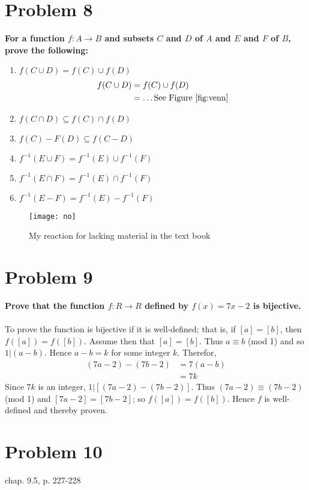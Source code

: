 \documentclass[english,11pt,a4paper]{article}
\begin{document}
\section*{Problem 8}
\textbf{For a function $f: A \rightarrow B$ and subsets $C$ and $D$ of $A$ and $E$ and $F$ of $B$, prove the following:}
\begin{enumerate}[a]
\item $f(C \cup D) = f(C)\cup f(D)$
\begin{align}
f(C \cup D) &= f(C)\cup f(D)\\
	&= \ldots \text{See Figure \ref{fig:venn}}
\end{align}
\item $f(C \cap D) \subseteq f(C)\cap f(D)$
\item $f(C)-F(D) \subseteq f(C-D)$
\item $f^{-1}(E\cup F)=f^{-1}(E) \cup f^{-1}(F)$
\item $f^{-1}(E\cap F)=f^{-1}(E) \cap f^{-1}(F)$
\item $f^{-1}(E - F)=f^{-1}(E) - f^{-1}(F)$
\end{enumerate}
\begin{figure}[hbtp]
\centering
\texttt{[image: no]}
\caption{My reaction for lacking material in the text book}
\label{fig:venn}
\end{figure}


\section*{Problem 9}
\textbf{Prove that the function $f: R \rightarrow R$ defined by $f(x)=7x-2$ is bijective.}
\\
\\
To prove the function is bijective if it is well-defined; that is, if $[a] = [b]$, then $f([a])=f([b])$.
Assume then that $[a]=[b]$.
Thus $a \equiv b$ (mod 1) and so $1|(a-b)$. 
Hence $a-b=k$ for some integer $k$. Therefor,
\begin{align}
(7a-2)-(7b-2) &= 7(a-b)\\
	&= 7k
\end{align}
Since $7k$ is an integer, $1|[(7a-2)-(7b-2)]$. Thus $(7a-2)\equiv (7b-2)$(mod 1) and $[7a-2]=[7b-2]$; so $f([a])=f([b])$. Hence $f$ is well-defined and thereby proven.

\section*{Problem 10}
chap. 9.5, p. 227-228\\
\end{document}
